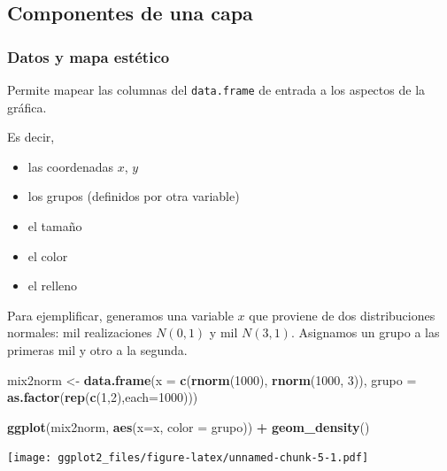 \documentclass[]{article}
\newenvironment{Shaded}{\begin{snugshade}}{\end{snugshade}}
\newcommand{\KeywordTok}[1]{\textcolor[rgb]{0.13,0.29,0.53}{\textbf{#1}}}
\newcommand{\DataTypeTok}[1]{\textcolor[rgb]{0.13,0.29,0.53}{#1}}
\newcommand{\DecValTok}[1]{\textcolor[rgb]{0.00,0.00,0.81}{#1}}
\newcommand{\StringTok}[1]{\textcolor[rgb]{0.31,0.60,0.02}{#1}}
\newcommand{\OperatorTok}[1]{\textcolor[rgb]{0.81,0.36,0.00}{\textbf{#1}}}
\newcommand{\NormalTok}[1]{#1}
\providecommand{\tightlist}{%
  \setlength{\itemsep}{0pt}\setlength{\parskip}{0pt}}
\begin{document}
\subsection{Componentes de una capa}\label{componentes-de-una-capa}

\subsubsection{Datos y mapa estético}\label{datos-y-mapa-estetico}

Permite mapear las columnas del \texttt{data.frame} de entrada a los
aspectos de la gráfica.

Es decir,

\begin{itemize}
\tightlist
\item
  las coordenadas \(x\), \(y\)
\item
  los grupos (definidos por otra variable)
\item
  el tamaño
\item
  el color
\item
  el relleno
\end{itemize}

Para ejemplificar, generamos una variable \(x\) que proviene de dos
distribuciones normales: mil realizaciones \(N(0, 1)\) y mil
\(N(3, 1)\). Asignamos un grupo a las primeras mil y otro a la segunda.

\begin{Shaded}
\begin{Highlighting}[]
\NormalTok{mix2norm <-}\StringTok{ }\KeywordTok{data.frame}\NormalTok{(}\DataTypeTok{x  =} \KeywordTok{c}\NormalTok{(}\KeywordTok{rnorm}\NormalTok{(}\DecValTok{1000}\NormalTok{), }\KeywordTok{rnorm}\NormalTok{(}\DecValTok{1000}\NormalTok{, }\DecValTok{3}\NormalTok{)), }
                       \DataTypeTok{grupo =} \KeywordTok{as.factor}\NormalTok{(}\KeywordTok{rep}\NormalTok{(}\KeywordTok{c}\NormalTok{(}\DecValTok{1}\NormalTok{,}\DecValTok{2}\NormalTok{),}\DataTypeTok{each=}\DecValTok{1000}\NormalTok{)))}

\KeywordTok{ggplot}\NormalTok{(mix2norm, }\KeywordTok{aes}\NormalTok{(}\DataTypeTok{x=}\NormalTok{x, }\DataTypeTok{color =}\NormalTok{ grupo)) }\OperatorTok{+}\StringTok{ }\KeywordTok{geom_density}\NormalTok{()}
\end{Highlighting}
\end{Shaded}

\texttt{[image: ggplot2\_files/figure-latex/unnamed-chunk-5-1.pdf]}
\end{document}
